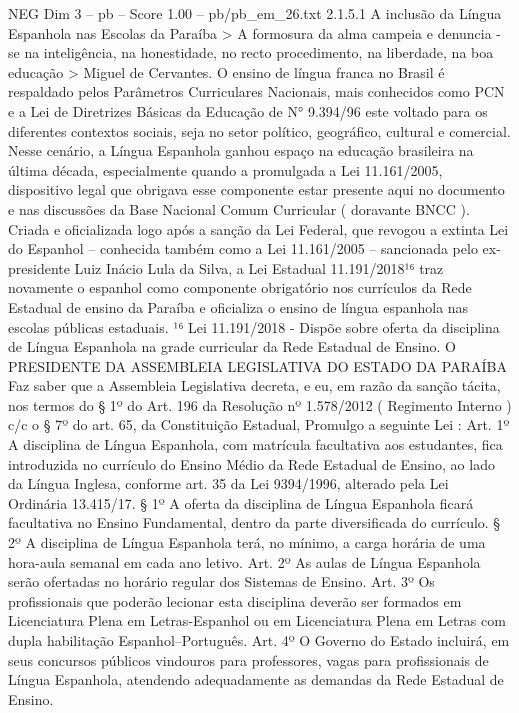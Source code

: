 \begin{textsample}{NEG Dim 3 – pb – Score 1.00 – pb/pb\_em\_26.txt}  \label{ex:f3_neg_210}
2.1.5.1 A inclusão da Língua Espanhola nas Escolas da Paraíba > A formosura da alma campeia e denuncia -se na inteligência, na honestidade, no recto procedimento, na liberdade, na boa educação > Miguel de Cervantes.
O ensino de língua franca no Brasil é respaldado pelos Parâmetros Curriculares Nacionais, mais conhecidos como PCN e a Lei de Diretrizes Básicas da Educação de N{\EmojiFont °} 9.394/96 este voltado para os diferentes contextos sociais, seja no setor político, geográfico, cultural e comercial.
Nesse cenário, a Língua Espanhola ganhou espaço na educação brasileira na última década, especialmente quando a promulgada a Lei 11.161/2005, dispositivo legal que obrigava esse componente estar presente aqui no documento e nas discussões da Base Nacional Comum Curricular ( doravante BNCC ).
Criada e oficializada logo após a sanção da Lei Federal, que revogou a extinta Lei do Espanhol – conhecida também como a Lei 11.161/2005 – sancionada pelo ex-presidente Luiz Inácio Lula da Silva, a Lei Estadual 11.191/2018¹⁶ traz novamente o espanhol como componente obrigatório nos currículos da Rede Estadual de ensino da Paraíba e oficializa o ensino de língua espanhola nas escolas públicas estaduais. ¹⁶ Lei 11.191/2018 - Dispõe sobre oferta da disciplina de Língua Espanhola na grade curricular da Rede Estadual de Ensino.
O PRESIDENTE DA ASSEMBLEIA LEGISLATIVA DO ESTADO DA PARAÍBA Faz saber que a Assembleia Legislativa decreta, e eu, em razão da sanção tácita, nos termos do § 1º do Art. 196 da Resolução nº 1.578/2012 ( Regimento Interno ) c/c o § 7º do art. 65, da Constituição Estadual, Promulgo a seguinte Lei : Art. 1º A disciplina de Língua Espanhola, com matrícula facultativa aos estudantes, fica introduzida no currículo do Ensino Médio da Rede Estadual de Ensino, ao lado da Língua Inglesa, conforme art. 35 da Lei 9394/1996, alterado pela Lei Ordinária 13.415/17. § 1º A oferta da disciplina de Língua Espanhola ficará facultativa no Ensino Fundamental, dentro da parte diversificada do currículo. § 2º A disciplina de Língua Espanhola terá, no mínimo, a carga horária de uma hora-aula semanal em cada ano letivo.
Art. 2º As aulas de Língua Espanhola serão ofertadas no horário regular dos Sistemas de Ensino.
Art. 3º Os profissionais que poderão lecionar esta disciplina deverão ser formados em Licenciatura Plena em Letras-Espanhol ou em Licenciatura Plena em Letras com dupla habilitação Espanhol–Português.
Art. 4º O Governo do Estado incluirá, em seus concursos públicos vindouros para professores, vagas para profissionais de Língua Espanhola, atendendo adequadamente as demandas da Rede Estadual de Ensino.

\end{textsample}
